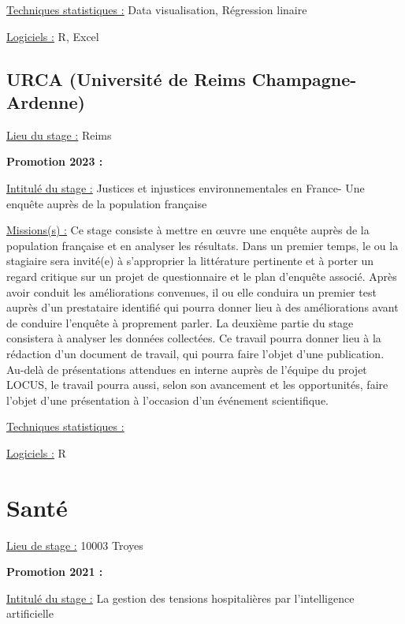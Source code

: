 \documentclass[
  letterpaper,
  DIV=11,
  numbers=noendperiod]{scrreprt}
\begin{document}
\uline{Techniques statistiques :} Data visualisation, Régression linaire

\uline{Logiciels :} R, Excel

\hypertarget{urca-universituxe9-de-reims-champagne-ardenne}{%
\section{\texorpdfstring{\textbf{URCA (Université de Reims
Champagne-Ardenne)}}{URCA (Université de Reims Champagne-Ardenne)}}\label{urca-universituxe9-de-reims-champagne-ardenne}}

\uline{Lieu du stage :} Reims

\textbf{Promotion 2023 :}

\uline{Intitulé du stage :} Justices et injustices environnementales en
France- Une enquête auprès de la population française

\uline{Missions(s) :} Ce stage consiste à mettre en œuvre une enquête
auprès de la population française et en analyser les résultats. Dans un
premier temps, le ou la stagiaire sera invité(e) à s'approprier la
littérature pertinente et à porter un regard critique sur un projet de
questionnaire et le plan d'enquête associé. Après avoir conduit les
améliorations convenues, il ou elle conduira un premier test auprès d'un
prestataire identifié qui pourra donner lieu à des améliorations avant
de conduire l'enquête à proprement parler. La deuxième partie du stage
consistera à analyser les données collectées. Ce travail pourra donner
lieu à la rédaction d'un document de travail, qui pourra faire l'objet
d'une publication. Au-delà de présentations attendues en interne auprès
de l'équipe du projet LOCUS, le travail pourra aussi, selon son
avancement et les opportunités, faire l'objet d'une présentation à
l'occasion d'un événement scientifique.

\uline{Techniques statistiques :}

\uline{Logiciels :} R


\hypertarget{santuxe9}{%
\chapter{Santé}\label{santuxe9}}

\uline{Lieu de stage :} 10003 Troyes

\textbf{Promotion 2021 :}

\uline{Intitulé du stage :} La gestion des tensions hospitalières par
l'intelligence artificielle
\end{document}
